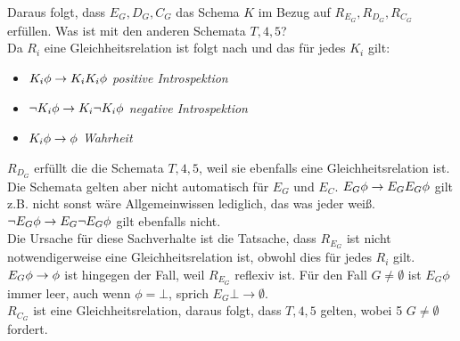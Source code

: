 Daraus folgt, dass $E_G, D_G, C_G$ das Schema $K$ im Bezug auf $R_{E_G}, R_{D_G}, R_{C_G}$ erfüllen.
Was ist mit den anderen Schemata $T,4,5$?\\
Da $R_i$ eine Gleichheitsrelation ist folgt nach  und   das für jedes $K_i$ gilt:
\begin{itemize}
	\item $K_i \phi \rightarrow K_i K_i \phi$ \emph{positive Introspektion}
	\item $\neg K_i \phi \rightarrow K_i \neg K_i \phi$ \emph{negative Introspektion}
	\item $K_i \phi \rightarrow \phi$ \emph{Wahrheit}
\end{itemize}

$R_{D_G}$ erfüllt die die Schemata $T,4,5$, weil sie ebenfalls eine Gleichheitsrelation ist.
Die Schemata gelten aber nicht automatisch für $E_G$ und $E_C$.
$E_G \phi \rightarrow E_G E_G \phi$ gilt z.B. nicht sonst wäre Allgemeinwissen lediglich, das was jeder weiß.
$\neg E_G \phi \rightarrow E_G \neg E_G \phi$ gilt ebenfalls nicht.\\
Die Ursache für diese Sachverhalte ist die Tatsache, dass $R_{E_G}$ ist nicht notwendigerweise eine Gleichheitsrelation ist, obwohl dies für jedes $R_i$ gilt.\\
$E_G \phi \rightarrow \phi$ ist hingegen der Fall, weil $R_{E_G}$ reflexiv ist.
Für den Fall $G \neq \emptyset$ ist $E_G \phi$ immer leer, auch wenn $\phi = \bot$, sprich $E_G \bot \rightarrow \emptyset$.\\
$R_{C_{G}}$ ist eine Gleichheitsrelation, daraus folgt, dass $T,4,5$ gelten, wobei 5 $G \neq \emptyset$ fordert.





